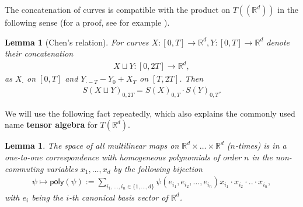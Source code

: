 \documentclass{scrartcl}
\theoremstyle{plain}
\newtheorem{lemma}[theorem]{Lemma}
\theoremstyle{definition}
\newcommand{\R}{\mathbb{R}}
\newcommand{\1}[1]{1_{\{#1\}}}
\newcommand{\ds}{d} %
\newcommand{\TC}{T((\R^\ds))} %
\newcommand{\TS}{T(\R^\ds)} %
\begin{document}
The concatenation of curves is compatible with the product on $\TC$ in the following sense
(for a proof, see for example \cite[Theorem 7.11]{bib:FV2010}).
\begin{lemma}[Chen's relation]
  \label{lem:chen}
  For curves $X: [0,T] \to \R^\ds, Y: [0,T] \to \R^\ds$ denote
  their concatenation
  \begin{align*}
    X \sqcup Y: [0,2T] \to \R^\ds,
  \end{align*}
  as $X_\cdot$ on $[0,T]$ and $Y_{\cdot-T} - Y_0 + X_T$ on $[T,2T]$.
  Then
  \begin{align*}
    S(X \sqcup Y)_{0,2T} = S(X)_{0,T} \cdot S(Y)_{0,T}.
  \end{align*}
\end{lemma}


%


We will use the following fact repeatedly,
which also explains the commonly used name \textbf{tensor algebra} for $\TS$.
\newcommand{\bijection}{\mathsf{poly}}
\begin{lemma}
  \label{lem:oneToOne}
  The space of all multilinear maps on $\R^{\ds} \times \dots \times \R^{\ds}$ ($n$-times)
  is in a one-to-one correspondence with homogeneous polynomials of order $n$ in the non-commuting variables $x_1,\dots,x_\ds$
  by the following bijection
  \begin{align*}
    \psi \mapsto \bijection(\psi) := \sum_{i_1, \dots, i_n \in \{1,\dots,\ds\}} \psi(e_{i_1}, e_{i_2}, \dots, e_{i_n}) x_{i_1} \cdot x_{i_2} \cdot .. \cdot x_{i_n},
  \end{align*}
  with $e_i$ being the $i$-th canonical basis vector of $\R^\ds$.
\end{lemma}
\end{document}
